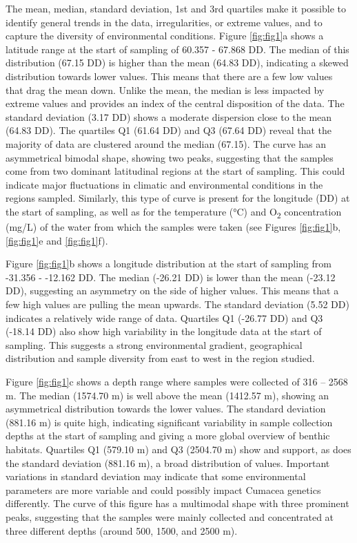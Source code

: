 The mean, median, standard deviation, 1st and 3rd quartiles make it possible to identify general trends in the data, irregularities, or extreme values, and to capture the diversity of environmental conditions. Figure \ref{fig:fig1}a shows a latitude range at the start of sampling of 60.357 - 67.868 DD. The median of this distribution (67.15 DD) is higher than the mean (64.83 DD), indicating a skewed distribution towards lower values. This means that there are a few low values that drag the mean down. Unlike the mean, the median is less impacted by extreme values and provides an index of the central disposition of the data. The standard deviation (3.17 DD) shows a moderate dispersion close to the mean (64.83 DD). The quartiles Q1 (61.64 DD) and Q3 (67.64 DD) reveal that the majority of data are clustered around the median (67.15). The curve has an asymmetrical bimodal shape, showing two peaks, suggesting that the samples come from two dominant latitudinal regions at the start of sampling. This could indicate major fluctuations in climatic and environmental conditions in the regions sampled.  Similarly, this type of curve is present for the longitude (DD) at the start of sampling, as well as for the temperature (°C) and O\textsubscript{2} concentration (mg/L) of the water from which the samples were taken (see Figures \ref{fig:fig1}b,  \ref{fig:fig1}e and \ref{fig:fig1}f).

Figure \ref{fig:fig1}b shows a longitude distribution at the start of sampling from -31.356 - -12.162 DD. The median (-26.21 DD) is lower than the mean (-23.12 DD), suggesting an asymmetry on the side of higher values. This means that a few high values are pulling the mean upwards. The standard deviation (5.52 DD) indicates a relatively wide range of data. Quartiles Q1 (-26.77 DD) and Q3 (-18.14 DD) also show high variability in the longitude data at the start of sampling. This suggests a strong environmental gradient, geographical distribution and sample diversity from east to west in the region studied. 

Figure \ref{fig:fig1}c shows a depth range where samples were collected of 316 – 2568 m. The median (1574.70 m) is well above the mean (1412.57 m), showing an asymmetrical distribution towards the lower values. The standard deviation (881.16 m) is quite high, indicating significant variability in sample collection depths at the start of sampling and giving a more global overview of benthic habitats. Quartiles Q1 (579.10 m) and Q3 (2504.70 m) show and support, as does the standard deviation (881.16 m), a broad distribution of values. Important variations in standard deviation may indicate that some environmental parameters are more variable and could possibly impact Cumacea genetics differently. The curve of this figure has a multimodal shape with three prominent peaks, suggesting that the samples were mainly collected and concentrated at three different depths (around 500, 1500, and 2500 m).

